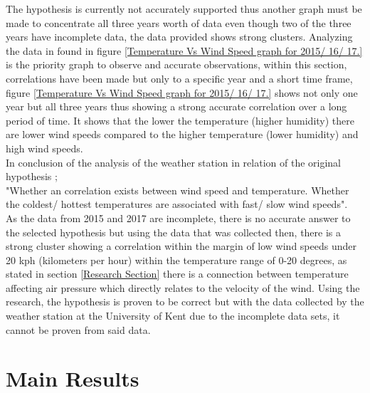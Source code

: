\documentclass[12pt]{article}
\begin{document}
The hypothesis is currently not accurately supported thus another graph must be made to concentrate all three years worth of data even though two of the three years have incomplete data, the data provided shows strong clusters. Analyzing the data in found in figure \ref{Temperature Vs Wind Speed graph for 2015/ 16/ 17.} is the priority graph to observe and accurate observations, within this section, correlations have been made but only to a specific year and a short time frame, figure \ref{Temperature Vs Wind Speed graph for 2015/ 16/ 17.} shows not only one year but all three years thus showing a strong accurate correlation over a long period of time. It shows that the lower the temperature (higher humidity) there are lower wind speeds compared to the higher temperature (lower humidity) and high wind speeds. \\

In conclusion of the analysis of the weather station in relation of the original hypothesis \cite{Weather_Station}; \\

"Whether an correlation exists between wind speed and temperature. Whether the coldest/ hottest temperatures are associated with fast/ slow wind speeds". \\

As the data from 2015 and 2017 are incomplete, there is no accurate answer to the selected hypothesis but using the data that was collected then, there is a strong cluster showing a correlation within the margin of low wind speeds under 20 kph (kilometers per hour) within the temperature range of 0-20 degrees, as stated in section \ref{Research Section} there is a connection between temperature affecting air pressure which directly relates to the velocity of the wind. Using the research, the hypothesis is proven to be correct but with the data collected by the weather station at the University of Kent due to the incomplete data sets, it cannot be proven from said data. 


\pagebreak
\section{Main Results}
\label{Main Results}
\end{document}
